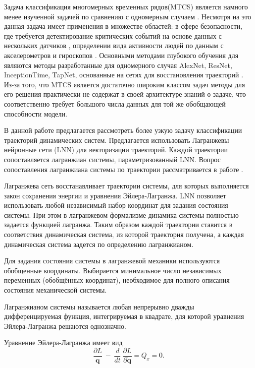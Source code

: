\documentclass[a4paper, 12pt]{article}
\begin{document}
Задача классификация многомерных временных рядов(MTCS) является намного менее изученной задачей по сравнению с одномерным случаем \cite{MTCSreview}. Несмотря на это данная задача имеет применения в множестве областей: в сфере безопасности, где требуется детектирование критических событий на основе данных с нескольких датчиков \cite{MTCSindustrial}, определении вида активности людей по данным с акселерометров и гироскопов \cite{MTCSactivity}. Основными методами глубокого обучения для являются методы разработанные для одномерного случая AlexNet, ResNet, InceptionTime, TapNet, основанные на сетях для восстановления траекторий \cite{MTCSreview}. Из-за того, что MTCS является достаточно широким классом задач методы для его решения практически не содержат в своей архитектуре знаний о задаче, что соответственно требует большого числа данных для той же обобщающей способности модели.

В данной работе предлагается рассмотреть более узкую задачу классификации траекторий динамических систем. Предлагается использовать Лагранжевы нейронные сети (LNN) для векторизации траекторий. Каждой траектории сопоставляется лагранжиан системы, параметризованный LNN. Вопрос сопоставления лагранжиана системы по траектории рассматривается  в работе \cite{article}. 

Лагранжева сеть восстанавливает траектории системы, для которых выполняется закон сохранения энергии и уравнения Эйлера-Лагранжа. LNN позволяет использовать любой независимый набор координат для задания состояния системы. При этом в лагранжевом формализме динамика системы полностью задается функцией лагранжа. Таким образом каждой траектории ставится в соответствия динамическая система, из которой траектория получена, а каждая динамическая система задется по определению лагранжианом. 

Для задания состояния системы в лагранжевой механики используются обобщенные координаты.  Выбирается минимальное число независимых переменных (обобщённых координат), необходимое для полного описания состояния механической системы. 

Лагранжианом системы называется любая непрерывно дважды дифференцируемая функция, интегрируемая в квадрате, для которой уравнения Эйлера-Лагранжа решаются однозначно.

Уравнение Эйлера-Лагранжа имеет вид
\begin{equation}
    \frac{\partial L}{\mathbf{q}}\ -\ \frac{d}{dt}\ \frac{\partial L}{\partial\dot{\mathbf{q}}}=Q_x=0.
\end{equation}
\end{document}
